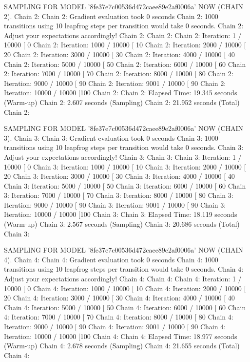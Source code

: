 \documentclass[
]{jss}
\begin{document}
\begin{CodeChunk}
\begin{CodeOutput}
SAMPLING FOR MODEL '8fe37e7c00536d472caee89e2af0006a' NOW (CHAIN 2).
Chain 2: 
Chain 2: Gradient evaluation took 0 seconds
Chain 2: 1000 transitions using 10 leapfrog steps per transition would take 0 seconds.
Chain 2: Adjust your expectations accordingly!
Chain 2: 
Chain 2: 
Chain 2: Iteration:    1 / 10000 [  0%
Chain 2: Iteration: 1000 / 10000 [ 10%
Chain 2: Iteration: 2000 / 10000 [ 20%
Chain 2: Iteration: 3000 / 10000 [ 30%
Chain 2: Iteration: 4000 / 10000 [ 40%
Chain 2: Iteration: 5000 / 10000 [ 50%
Chain 2: Iteration: 6000 / 10000 [ 60%
Chain 2: Iteration: 7000 / 10000 [ 70%
Chain 2: Iteration: 8000 / 10000 [ 80%
Chain 2: Iteration: 9000 / 10000 [ 90%
Chain 2: Iteration: 9001 / 10000 [ 90%
Chain 2: Iteration: 10000 / 10000 [100%
Chain 2: 
Chain 2:  Elapsed Time: 19.345 seconds (Warm-up)
Chain 2:                2.607 seconds (Sampling)
Chain 2:                21.952 seconds (Total)
Chain 2: 

SAMPLING FOR MODEL '8fe37e7c00536d472caee89e2af0006a' NOW (CHAIN 3).
Chain 3: 
Chain 3: Gradient evaluation took 0 seconds
Chain 3: 1000 transitions using 10 leapfrog steps per transition would take 0 seconds.
Chain 3: Adjust your expectations accordingly!
Chain 3: 
Chain 3: 
Chain 3: Iteration:    1 / 10000 [  0%
Chain 3: Iteration: 1000 / 10000 [ 10%
Chain 3: Iteration: 2000 / 10000 [ 20%
Chain 3: Iteration: 3000 / 10000 [ 30%
Chain 3: Iteration: 4000 / 10000 [ 40%
Chain 3: Iteration: 5000 / 10000 [ 50%
Chain 3: Iteration: 6000 / 10000 [ 60%
Chain 3: Iteration: 7000 / 10000 [ 70%
Chain 3: Iteration: 8000 / 10000 [ 80%
Chain 3: Iteration: 9000 / 10000 [ 90%
Chain 3: Iteration: 9001 / 10000 [ 90%
Chain 3: Iteration: 10000 / 10000 [100%
Chain 3: 
Chain 3:  Elapsed Time: 18.119 seconds (Warm-up)
Chain 3:                2.567 seconds (Sampling)
Chain 3:                20.686 seconds (Total)
Chain 3: 

SAMPLING FOR MODEL '8fe37e7c00536d472caee89e2af0006a' NOW (CHAIN 4).
Chain 4: 
Chain 4: Gradient evaluation took 0 seconds
Chain 4: 1000 transitions using 10 leapfrog steps per transition would take 0 seconds.
Chain 4: Adjust your expectations accordingly!
Chain 4: 
Chain 4: 
Chain 4: Iteration:    1 / 10000 [  0%
Chain 4: Iteration: 1000 / 10000 [ 10%
Chain 4: Iteration: 2000 / 10000 [ 20%
Chain 4: Iteration: 3000 / 10000 [ 30%
Chain 4: Iteration: 4000 / 10000 [ 40%
Chain 4: Iteration: 5000 / 10000 [ 50%
Chain 4: Iteration: 6000 / 10000 [ 60%
Chain 4: Iteration: 7000 / 10000 [ 70%
Chain 4: Iteration: 8000 / 10000 [ 80%
Chain 4: Iteration: 9000 / 10000 [ 90%
Chain 4: Iteration: 9001 / 10000 [ 90%
Chain 4: Iteration: 10000 / 10000 [100%
Chain 4: 
Chain 4:  Elapsed Time: 18.977 seconds (Warm-up)
Chain 4:                2.678 seconds (Sampling)
Chain 4:                21.655 seconds (Total)
Chain 4: 


\end{CodeOutput}
\end{CodeChunk}
\end{document}
